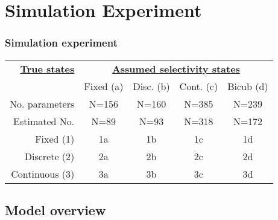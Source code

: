 \documentclass[table]{beamer}
\begin{document}
\section{Simulation Experiment} %
\label{sec:simulation_experiment}


\begin{frame}[m]\frametitle{Simulation experiment}
 \begin{center}
 	
 \begin{tabular}{r|cccc}
		\hline
		\textbf{\textbf{\underline{True states}}}
		&\multicolumn{4}{c}{\textbf{\underline{Assumed selectivity states}}}\\
		&{Fixed (a)} & {Disc. (b)} & {Cont. (c)}
		&{Bicub (d)} \\
		No. parameters&{N=156} & {N=160} & {N=385} & {N=239}\\
		Estimated No. &{N=89} & {N=93} & {N=318} & {N=172}\\
		\hline
		 {Fixed (1)}      & 1a & 1b & 1c & 1d \\
		 {Discrete (2)}   & 2a & 2b & 2c & 2d \\
		 {Continuous (3)} & 3a & 3b & 3c & 3d \\
		\hline


		\hline
		\end{tabular}
 \end{center}
\end{frame}
\subsection{Model overview} %
\label{sub:model_overview}
\end{document}
